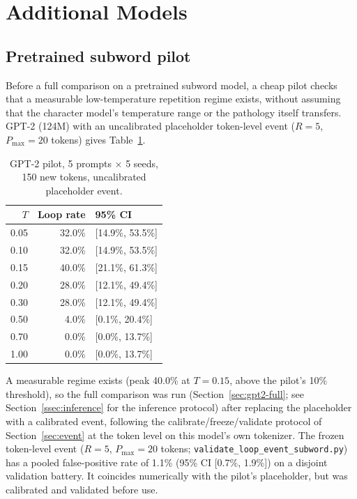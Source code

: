 \section{Additional Models}
\label{sec:generalization}

\subsection{Pretrained subword pilot}
Before a full comparison on a pretrained subword model, a cheap pilot checks that a measurable low-temperature repetition regime exists, without assuming that the character model's temperature range or the pathology itself transfers. GPT-2 (124M) with an uncalibrated placeholder token-level event ($R{=}5$, $P_{\max}{=}20$ tokens) gives Table~\ref{tab:gpt2pilot}.

\begin{table}[ht]
\centering
\caption{GPT-2 pilot, 5 prompts $\times$ 5 seeds, 150 new tokens, uncalibrated placeholder event.}
\label{tab:gpt2pilot}
\begin{tabular}{@{}rrl@{}}
\toprule
$T$ & Loop rate & 95\% CI \\
\midrule
0.05 & 32.0\% & [14.9\%, 53.5\%] \\
0.10 & 32.0\% & [14.9\%, 53.5\%] \\
0.15 & 40.0\% & [21.1\%, 61.3\%] \\
0.20 & 28.0\% & [12.1\%, 49.4\%] \\
0.30 & 28.0\% & [12.1\%, 49.4\%] \\
0.50 & 4.0\%  & [0.1\%, 20.4\%] \\
0.70 & 0.0\%  & [0.0\%, 13.7\%] \\
1.00 & 0.0\%  & [0.0\%, 13.7\%] \\
\bottomrule
\end{tabular}
\end{table}

A measurable regime exists (peak 40.0\% at $T{=}0.15$, above the pilot's 10\% threshold), so the full comparison was run (Section~\ref{sec:gpt2-full}; see Section~\ref{ssec:inference} for the inference protocol) after replacing the placeholder with a calibrated event, following the calibrate/freeze/validate protocol of Section~\ref{sec:event} at the token level on this model's own tokenizer. The frozen token-level event ($R{=}5$, $P_{\max}{=}20$ tokens; \texttt{validate\_\allowbreak{}loop\_\allowbreak{}event\_\allowbreak{}subword.py}) has a pooled false-positive rate of 1.1\% (95\% CI [0.7\%, 1.9\%]) on a disjoint validation battery. It coincides numerically with the pilot's placeholder, but was calibrated and validated before use.

